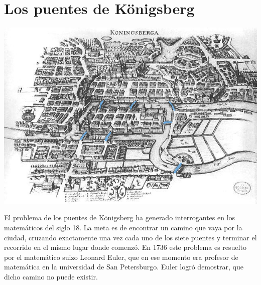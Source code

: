 \documentclass[12pt]{article}
\begin{document}
\section{Los puentes de K\"{o}nigsberg}
\begin{center}

\includegraphics[scale=0.5]{koenigsberg.jpg}
\end{center}
El problema de los puentes de K\"{o}nigsberg ha generado interrogantes en los matemáticos del siglo 18. La meta es de encontrar un camino que vaya por la ciudad, cruzando exactamente una vez cada uno de los siete puentes y terminar el recorrido en el mismo lugar donde comenzó. En 1736 este problema es resuelto por el matemático suizo Leonard Euler, que en ese momento era profesor de matemática en la universidad de San Petersburgo. Euler logró demostrar, que dicho camino no puede existir.
\end{document}

